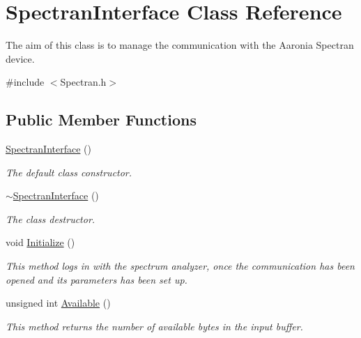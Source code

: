 \hypertarget{classSpectranInterface}{}\section{Spectran\+Interface Class Reference}
\label{classSpectranInterface}


The aim of this class is to manage the communication with the Aaronia Spectran device.  




{\ttfamily \#include $<$Spectran.\+h$>$}

\subsection*{Public Member Functions}
\begin{DoxyCompactItemize}
\item 
\hyperlink{classSpectranInterface_a9ace3807dcbbf01313890871d6a60f51}{Spectran\+Interface} ()
\begin{DoxyCompactList}\small\item\em The default class constructor. \end{DoxyCompactList}\item 
\hyperlink{classSpectranInterface_a52592fb5fe9d7734d869540826b47325}{$\sim$\+Spectran\+Interface} ()
\begin{DoxyCompactList}\small\item\em The class destructor. \end{DoxyCompactList}\item 
void \hyperlink{classSpectranInterface_a29d4a40c802f909b19014a5bfdac7db5}{Initialize} ()
\begin{DoxyCompactList}\small\item\em This method logs in with the spectrum analyzer, once the communication has been opened and its parameters has been set up. \end{DoxyCompactList}\item 
\mbox{\label{classSpectranInterface_a31b64b69e1d99723fea1fd9c112dcfda}} 
unsigned int \hyperlink{classSpectranInterface_a31b64b69e1d99723fea1fd9c112dcfda}{Available} ()
\begin{DoxyCompactList}\small\item\em This method returns the number of available bytes in the input buffer. \end{DoxyCompactList}\item 

\end{DoxyCompactItemize}
